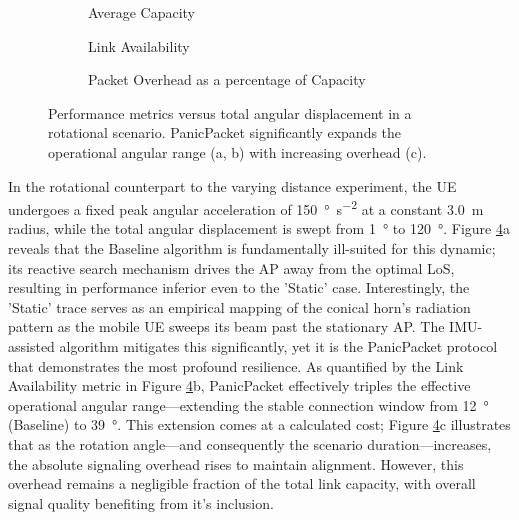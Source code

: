 \documentclass[fleqn,10pt]{wlscirep}
\begin{document}
\begin{figure}[ht!]
    \centering
    \begin{subfigure}[t]{0.49\textwidth}
        \vspace{0pt} %
        \centering
        
        \vspace{-25 pt}
        \caption{Average Capacity}
        \label{fig:angle_rate}
    \end{subfigure}%
    \hfill
    \begin{minipage}[t]{0.49\textwidth}
        \vspace{0pt} %
        \centering
        \begin{subfigure}{\linewidth}
            
            \vspace{-25 pt}
            \caption{Link Availability}
        \label{fig:angle_avail}
        \end{subfigure}
        \vfill
        \begin{subfigure}{\linewidth}
            
            \vspace{-25 pt}
            \caption{Packet Overhead as a percentage of Capacity}
        \label{fig:angle_overhead}
        \end{subfigure}
    \end{minipage}
    \caption{Performance metrics versus total angular displacement in a rotational scenario. PanicPacket significantly expands the operational angular range (a, b) with increasing overhead (c).}
    \label{fig:angle_effects}
\end{figure}

In the rotational counterpart to the varying distance experiment, the UE undergoes a fixed peak angular acceleration of \SI{150}{\degree\per\second\squared} at a constant \SI{3.0}{\meter} radius, while the total angular displacement is swept from \SI{1}{\degree} to \SI{120}{\degree}. Figure \ref{fig:angle_effects}a reveals that the Baseline algorithm is fundamentally ill-suited for this dynamic; its reactive search mechanism drives the AP away from the optimal LoS, resulting in performance inferior even to the 'Static' case. Interestingly, the 'Static' trace serves as an empirical mapping of the conical horn's radiation pattern as the mobile UE sweeps its beam past the stationary AP. The IMU-assisted algorithm mitigates this significantly, yet it is the PanicPacket protocol that demonstrates the most profound resilience. As quantified by the Link Availability metric in Figure \ref{fig:angle_effects}b, PanicPacket effectively triples the effective operational angular range—extending the stable connection window from \SI{12}{\degree} (Baseline) to \SI{39}{\degree}. This extension comes at a calculated cost; Figure \ref{fig:angle_effects}c illustrates that as the rotation angle—and consequently the scenario duration—increases, the absolute signaling overhead rises to maintain alignment. However, this overhead remains a negligible fraction of the total link capacity, with overall signal quality benefiting from it's inclusion.
\end{document}
